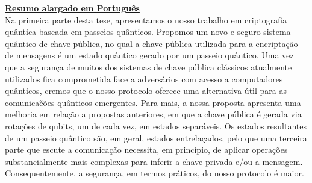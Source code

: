 \documentclass[12pt]{report}
\begin{document}
\noindent\underline{\textbf{Resumo alargado em Portugu\^{e}s}}\\
Na primeira parte desta tese, apresentamos o nosso trabalho em criptografia qu\^{a}ntica baseada em passeios  qu\^{a}nticos. Propomos um novo e seguro sistema qu\^{a}ntico de chave p\'{u}blica, no qual a chave p\'{u}blica utilizada para a encripta\c{c}\~{a}o de mensagens \'{e} um estado qu\^{a}ntico gerado por um passeio qu\^{a}ntico. Uma vez que a seguran\c{c}a de muitos dos sistemas de chave p\'{u}blica cl\'{a}ssicos atualmente utilizados fica comprometida face a advers\'{a}rios com acesso a computadores qu\^{a}nticos, cremos que o nosso protocolo oferece uma alternativa \'{u}til para as comunica\~{c}\~{o}es qu\^{a}nticos emergentes. Para mais, a nossa proposta apresenta uma melhoria em rela\c{c}\~{a}o a propostas anteriores, em que a chave p\'{u}blica \'{e} gerada via rota\c{c}\~{o}es de qubits, um de cada vez, em estados separ\'{a}veis. Os estados resultantes de um passeio qu\^{a}ntico s\~{a}o, em geral, estados entrela\c{c}ados, pelo que uma terceira parte que escute a comunica\c{c}\~{a}o necessita, em princ\'{i}pio, de aplicar opera\c{c}\~{o}es substancialmente mais complexas para inferir a chave privada e/ou a mensagem. Consequentemente, a seguran\c{c}a, em termos pr\'{a}ticos, do nosso protocolo \'{e} maior.
\end{document}
